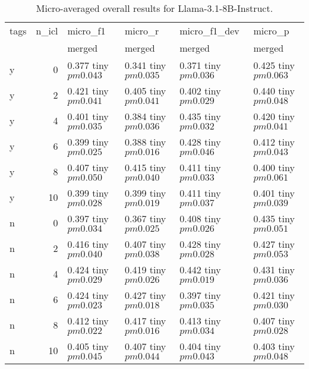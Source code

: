 \begin{table}
\caption{Micro-averaged overall results for Llama-3.1-8B-Instruct.}
\label{results_micro}
\begin{tabular}{lrllll}
\toprule
tags & n_icl & micro_f1 & micro_r & micro_f1_dev & micro_p \\
 &  & merged & merged & merged & merged \\
\midrule
y & 0 & 0.377 tiny $ pm 0.043$ & 0.341 tiny $ pm 0.035$ & 0.371 tiny $ pm 0.036$ & 0.425 tiny $ pm 0.063$ \\
y & 2 & 0.421 tiny $ pm 0.041$ & 0.405 tiny $ pm 0.041$ & 0.402 tiny $ pm 0.029$ & 0.440 tiny $ pm 0.048$ \\
y & 4 & 0.401 tiny $ pm 0.035$ & 0.384 tiny $ pm 0.036$ & 0.435 tiny $ pm 0.032$ & 0.420 tiny $ pm 0.041$ \\
y & 6 & 0.399 tiny $ pm 0.025$ & 0.388 tiny $ pm 0.016$ & 0.428 tiny $ pm 0.046$ & 0.412 tiny $ pm 0.043$ \\
y & 8 & 0.407 tiny $ pm 0.050$ & 0.415 tiny $ pm 0.040$ & 0.411 tiny $ pm 0.033$ & 0.400 tiny $ pm 0.061$ \\
y & 10 & 0.399 tiny $ pm 0.028$ & 0.399 tiny $ pm 0.019$ & 0.411 tiny $ pm 0.037$ & 0.401 tiny $ pm 0.039$ \\
n & 0 & 0.397 tiny $ pm 0.034$ & 0.367 tiny $ pm 0.025$ & 0.408 tiny $ pm 0.026$ & 0.435 tiny $ pm 0.051$ \\
n & 2 & 0.416 tiny $ pm 0.040$ & 0.407 tiny $ pm 0.038$ & 0.428 tiny $ pm 0.028$ & 0.427 tiny $ pm 0.053$ \\
n & 4 & 0.424 tiny $ pm 0.029$ & 0.419 tiny $ pm 0.026$ & 0.442 tiny $ pm 0.019$ & 0.431 tiny $ pm 0.036$ \\
n & 6 & 0.424 tiny $ pm 0.023$ & 0.427 tiny $ pm 0.018$ & 0.397 tiny $ pm 0.035$ & 0.421 tiny $ pm 0.030$ \\
n & 8 & 0.412 tiny $ pm 0.022$ & 0.417 tiny $ pm 0.016$ & 0.413 tiny $ pm 0.034$ & 0.407 tiny $ pm 0.028$ \\
n & 10 & 0.405 tiny $ pm 0.045$ & 0.407 tiny $ pm 0.044$ & 0.404 tiny $ pm 0.043$ & 0.403 tiny $ pm 0.048$ \\
\bottomrule
\end{tabular}
\end{table}
